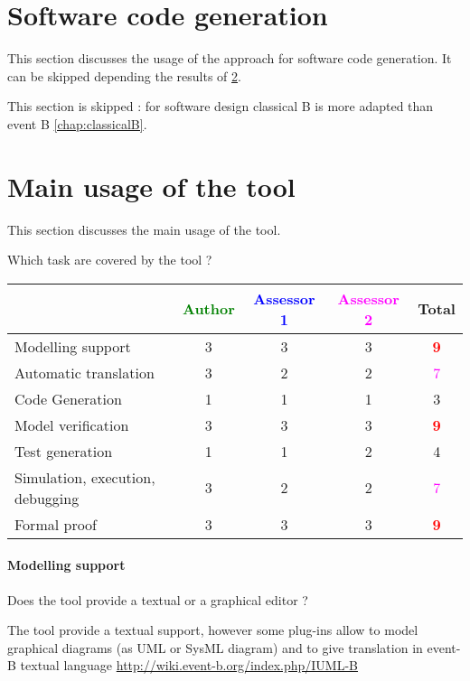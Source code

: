 \section{Software code generation}
This section discusses the usage of the approach for software code generation.
It can be skipped depending the results of \ref{main_usage}.


\begin{author_comment}
This section is skipped :  for software design classical B is more adapted than event B \ref{chap:classicalB}.
\end{author_comment}




\section{Main usage of the tool}
\label{main_usage}

This section discusses the main usage of the tool.

Which task are covered by the tool ?


\begin{tabular}{|l | c | c | c | c|}
\hline
& \textcolor{green}{Author} & \textcolor{blue}{Assessor 1} & \textcolor{magenta}{Assessor 2} & Total \\
\hline 
Modelling support & 3     & 3     & 3     & \textcolor{red}{\textbf{9}} \\
\hline
Automatic translation  & 3     & 2     & 2     & \textcolor{magenta}{7} \\
\hline
Code Generation  & 1     & 1     & 1     & 3     \\
\hline
Model verification & 3     & 3     & 3     & \textcolor{red}{\textbf{9}} \\
\hline
Test generation & 1     & 1     & 2     & 4     \\
\hline
Simulation, execution, debugging & 3     & 2     & 2     & \textcolor{magenta}{7} \\
\hline
Formal proof & 3     & 3     & 3     & \textcolor{red}{\textbf{9}} \\
\hline
\end{tabular}

\paragraph{Modelling support}
Does the tool provide a  textual or a graphical editor ?


\begin{author_comment}
The tool provide a textual support, however some plug-ins allow to  model graphical diagrams (as UML or SysML diagram) and to give translation in event-B textual language \url{http://wiki.event-b.org/index.php/IUML-B}
\end{author_comment}



